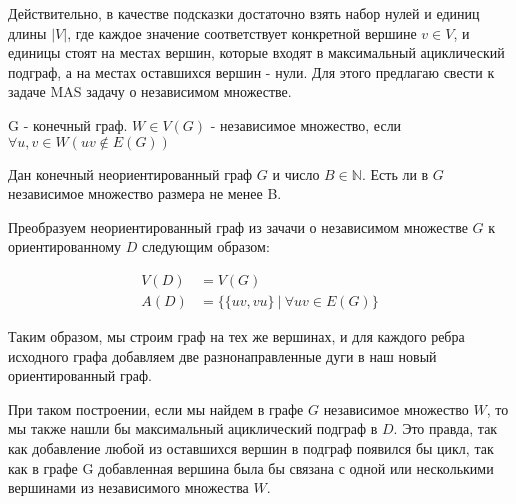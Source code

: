 Действительно, в качестве подсказки достаточно взять набор нулей 
и единиц длины $|V|$, где каждое значение соответствует конкретной 
вершине $v \in V$, и единицы стоят на местах вершин, которые входят 
в максимальный ациклический подграф, а на местах оставшихся вершин - 
нули.
Для этого предлагаю свести к задаче MAS задачу о независимом множестве.
\begin{definition}
    G - конечный граф. $W \in V(G)$ - независимое множество, если \\
    $\forall u,v \in W (uv \notin E(G))$
\end{definition}
\begin{problem}
    Дан конечный неориентированный граф $G$ и число $B \in \mathbb{N}$.
    Есть ли в $G$ независимое множество размера не менее B.
\end{problem}

Преобразуем неориентированный граф из зачачи о независимом множестве $G$
к ориентированному $D$ следующим образом:

\begin{align*}
    V(D) &= V(G) \\ 
    A(D) &= \{\{uv, vu\} ~|~ \forall uv \in E(G)\}
\end{align*}

Таким образом, мы строим граф на тех же вершинах, и для каждого ребра
исходного графа добавляем две разнонаправленные дуги в наш новый 
ориентированный граф.

При таком построении, если мы найдем в графе $G$ независимое множество $W$, то
мы также нашли бы максимальный ациклический подграф в $D$. Это правда, так как
добавление любой из оставшихся вершин в подграф появился бы цикл, так как
в графе G добавленная вершина была бы связана с одной или несколькими вершинами
из независимого множества $W$.

